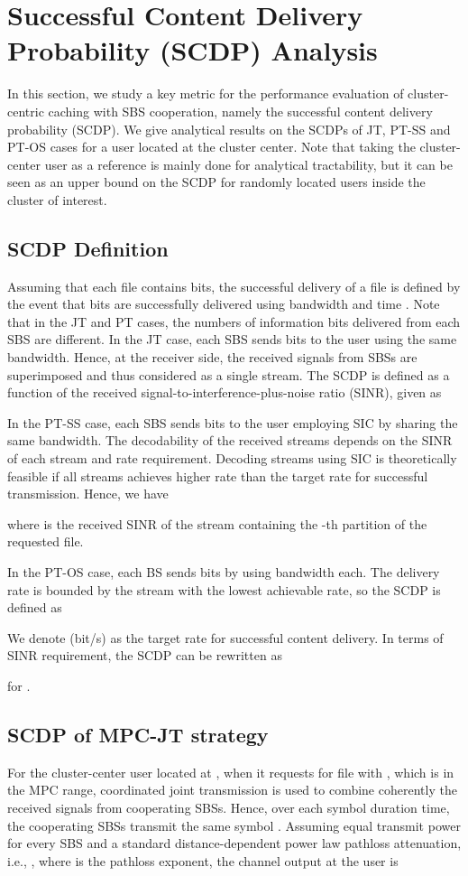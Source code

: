 \documentclass[twocolumns,10pt]{IEEEtran}
\begin{document}
 
\section{Successful Content Delivery Probability (SCDP) Analysis}
\label{SCDP}
In this section, we study a key metric for the performance evaluation of cluster-centric caching with SBS cooperation, namely the successful content delivery probability (SCDP). We give analytical results on the SCDPs of JT, PT-SS and PT-OS cases for a user located at the cluster center. Note that taking the cluster-center user as a reference is mainly done for analytical tractability, but it can be seen as an upper bound on the SCDP for randomly located users inside the cluster of interest. 


\subsection{SCDP Definition}
Assuming that each file contains  bits, the successful delivery of a file is defined by the event that  bits are successfully delivered using bandwidth  and time . Note that in the JT and PT cases, the numbers of information bits delivered from each SBS are different.
In the JT case, each SBS sends  bits to the user using the same bandwidth. Hence, at the receiver side, the received signals from  SBSs are superimposed and thus considered as a single stream. The SCDP is defined as a function of the received signal-to-interference-plus-noise ratio (SINR), given as 


In the PT-SS case, each SBS sends  bits to the user employing SIC by sharing the same  bandwidth.  The decodability of the received streams depends on the SINR of each stream and rate requirement. 
Decoding  streams using SIC is theoretically feasible if all  streams achieves higher rate than the target rate for successful transmission\cite{SIC}. Hence, we have

where  is the received SINR of the stream containing the -th partition of the requested file. 

In the PT-OS case, each BS sends  bits by using  bandwidth each. The delivery rate is bounded by the stream with the lowest achievable rate, so the SCDP is defined as


We denote  (bit/s) as the target rate for successful content delivery. In terms of SINR requirement, the SCDP can be rewritten as 

for .




\subsection{SCDP of MPC-JT strategy} 
\label{JT}
For the cluster-center user located at , when it requests for file  with , which is in the MPC range, coordinated joint transmission is used to combine coherently the received signals from cooperating SBSs. Hence, over each symbol duration time, the cooperating SBSs transmit the same symbol . Assuming equal transmit power  for every SBS and a standard distance-dependent power law pathloss attenuation, i.e., , where  is the pathloss exponent, the channel output at the user is
 
\end{document}

